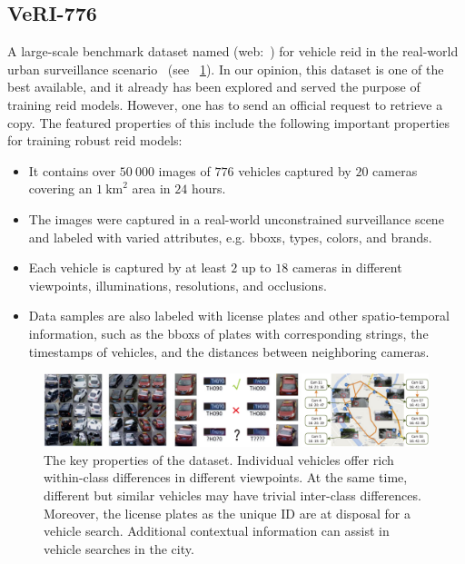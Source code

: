 \subsection{VeRI-776}
\label{ssec:DatasetVeRI776}

A large-scale benchmark dataset named \verisss{} (web:~\cite{webveridataset}) for vehicle \gls{reid} in the real-world urban surveillance scenario~\cite{liu2018provid} (see \figstr{}~\ref{fig:VeRI776Dataset}). In our opinion, this dataset is one of the best available, and it already has been explored and served the purpose of training \gls{reid} models. However, one has to send an official request to retrieve a copy. The featured properties of this include the following important properties for training robust \gls{reid} models:

\begin{itemize}
    \item It contains over $50\ 000$ images of $776$ vehicles captured by $20$ cameras covering an $1\  \text{km}^2$ area in $24$ hours.
    \item The images were captured in a real-world unconstrained surveillance scene and labeled with varied attributes, e.g. \glspl{bbox}, types, colors, and brands.
    \item Each vehicle is captured by at least $2$ up to $18$ cameras in different viewpoints, illuminations, resolutions, and occlusions.
    \item Data samples are also labeled with license plates and other spatio-temporal information, such as the \glspl{bbox} of plates with corresponding strings, the timestamps of vehicles, and the distances between neighboring cameras.
\end{itemize}

\begin{figure}[t]
    \centerline{\includegraphics[width=\linewidth]{figures/datasets/veri776__overview.pdf}}
    \caption[\verisss{} dataset]{The key properties of the \verisss{} dataset. Individual vehicles offer rich within-class differences in different viewpoints. At the same time, different but similar vehicles may have trivial inter-class differences. Moreover, the license plates as the unique ID are at disposal for a vehicle search. Additional contextual information can assist in vehicle searches in the city. }
    \label{fig:VeRI776Dataset}
\end{figure}

